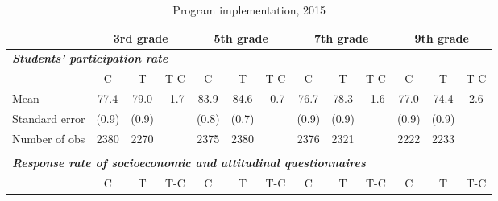 \documentclass[
	article,			%
	12pt,				%
	oneside,			%
	a4paper,			%
	]{article}
\begin{document}

\begin{table}[h!]
\centering
\fontsize{8}{10}\selectfont
\caption{Program implementation, 2015}

\begin{tabular}{lcccccccccccc}
\hline
\hline
           &       \multicolumn{ 3}{c}{3rd grade} &       \multicolumn{ 3}{c}{5th grade} &       \multicolumn{ 3}{c}{7th grade} &       \multicolumn{ 3}{c}{9th grade} \\
\hline
                                                                                                        \multicolumn{ 13}{l}{{\it {\bf Students' participation rate}}} \\

{\it {\bf }} &          C &          T &        T-C &          C &          T &        T-C &          C &          T &        T-C &          C &          T &        T-C \\

      Mean &       77.4 &       79.0 &      -1.7 &       83.9 &       84.6 &       -0.7 &       76.7 &       78.3 &       -1.6 &       77.0 &       74.4 &       2.6 \\

Standard error &      (0.9) &      (0.9) &            &      (0.8) &      (0.7) &            &      (0.9) &      (0.9) &            &      (0.9) &      (0.9) &            \\

Number of obs &       2380 &       2270 &            &       2375 &       2380 &            &       2376 &       2321 &            &       2222 &       2233 &            \\


           &            &            &            &            &            &            &            &            &            &            &            &            \\
\hline
                                                                       \multicolumn{ 13}{l}{{\it {\bf Response rate of socioeconomic and attitudinal questionnaires}}} \\

{\it {\bf }} &          C &          T &        T-C &          C &          T &        T-C &          C &          T &        T-C &          C &          T &        T-C \\


\end{tabular}
\end{table}
\end{document}
